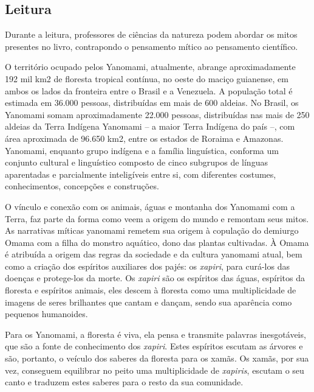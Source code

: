 \documentclass[12pt]{extarticle}
\begin{document}

\subsection{Leitura}

Durante a leitura, professores de ciências da natureza podem
abordar os mitos presentes no livro, contrapondo o pensamento mítico ao
pensamento científico.

O território ocupado pelos Yanomami, atualmente, abrange aproximadamente 
192 mil km2 de floresta tropical contínua, no oeste do maciço guianense, 
em ambos os lados da fronteira entre o Brasil e a Venezuela. A população 
total é estimada em 36.000 pessoas, distribuídas em  mais de 600 aldeias. 
No Brasil, os Yanomami somam aproximadamente 22.000 pessoas, distribuídas 
nas mais de 250 aldeias da Terra Indígena Yanomami – a maior Terra Indígena 
do país –, com área aproximada de 96.650 km2, entre os estados de Roraima e 
Amazonas. Yanomami, enquanto grupo indígena e a família linguística, conforma
um conjunto cultural e linguístico composto de cinco subgrupos de línguas 
aparentadas e parcialmente inteligíveis entre si, com diferentes costumes, 
conhecimentos, concepções e construções.

O vínculo e conexão com os animais, águas e montanha dos Yanomami com a 
Terra, faz parte da forma como veem a origem do mundo e remontam seus mitos. 
As narrativas míticas yanomami remetem sua origem à copulação do demiurgo 
Omama com a filha do monstro aquático, dono das plantas cultivadas. À Omama
é atribuída a origem das regras da sociedade e da cultura yanomami atual,
bem como a criação dos espíritos auxiliares dos pajés: os \emph{xapiri}, 
para curá-los das doenças e protege-los da morte. Os \emph{xapiri} são os 
espíritos das águas, espíritos da floresta e espíritos animais, eles descem 
à floresta como uma multiplicidade de imagens de seres brilhantes que cantam 
e dançam, sendo sua aparência como pequenos humanoides.

Para os Yanomami, a floresta é viva, ela pensa e transmite palavras inesgotáveis,
que são a fonte de conhecimento dos \emph{xapiri}. Estes espíritos escutam as 
árvores e são, portanto, o veículo dos saberes da floresta para os xamãs. Os xamãs,
por sua vez, conseguem equilibrar no peito uma multiplicidade de \emph{xapiris}, 
escutam o seu canto e traduzem estes saberes para o resto da sua comunidade.
\end{document}
